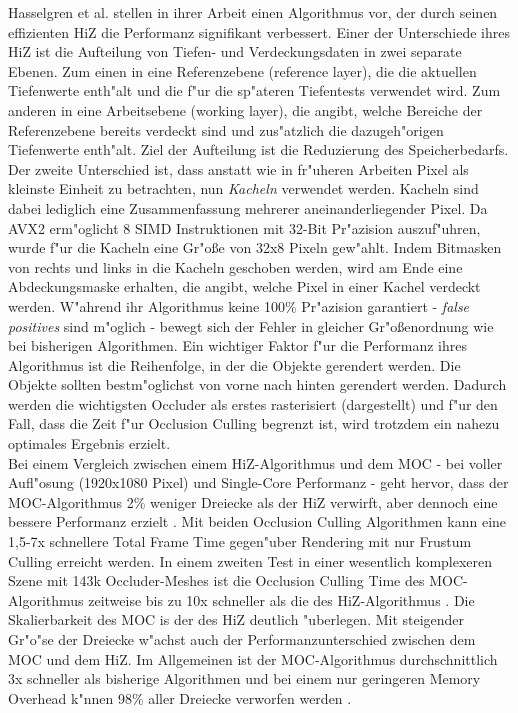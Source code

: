 \documentclass[journal]{vgtc}
\begin{document}
Hasselgren et al. \cite{MSOC} stellen in ihrer Arbeit einen Algorithmus vor, der durch seinen effizienten HiZ die Performanz signifikant verbessert.
Einer der Unterschiede ihres HiZ ist die Aufteilung von Tiefen- und Verdeckungsdaten in zwei separate Ebenen.
Zum einen in eine Referenzebene (reference layer), die die aktuellen Tiefenwerte enth"alt und die f"ur die sp"ateren Tiefentests verwendet wird.
Zum anderen in eine Arbeitsebene (working layer), die angibt, welche Bereiche der Referenzebene bereits verdeckt sind und zus"atzlich die dazugeh"origen Tiefenwerte enth"alt.
Ziel der Aufteilung ist die Reduzierung des Speicherbedarfs.
Der zweite Unterschied ist, dass anstatt wie in fr"uheren Arbeiten Pixel als kleinste Einheit zu betrachten, nun \textit{Kacheln} verwendet werden.
Kacheln sind dabei lediglich eine Zusammenfassung mehrerer aneinanderliegender Pixel.
Da AVX2 erm"oglicht 8 SIMD Instruktionen mit 32-Bit Pr"azision auszuf"uhren, wurde f"ur die Kacheln eine Gr"o\ss{}e von 32x8 Pixeln gew"ahlt.
Indem Bitmasken von rechts und links in die Kacheln geschoben werden, wird am Ende eine Abdeckungsmaske erhalten, die angibt, welche Pixel in einer Kachel verdeckt werden.
W"ahrend ihr Algorithmus keine 100\% Pr"azision garantiert - \textit{false positives} sind m"oglich - bewegt sich der Fehler in gleicher Gr"o\ss{}enordnung wie bei bisherigen Algorithmen.
Ein wichtiger Faktor f"ur die Performanz ihres Algorithmus ist die Reihenfolge, in der die Objekte gerendert werden.
Die Objekte sollten bestm"oglichst von vorne nach hinten gerendert werden.
Dadurch werden die wichtigsten Occluder als erstes rasterisiert (dargestellt) und f"ur den Fall, dass die Zeit f"ur Occlusion Culling begrenzt ist, wird trotzdem ein nahezu optimales Ergebnis erzielt.\\

Bei einem Vergleich zwischen einem HiZ-Algorithmus und dem MOC - bei voller Aufl"osung (1920x1080 Pixel) und Single-Core Performanz - geht hervor, dass der MOC-Algorithmus 2\% weniger Dreiecke als der HiZ verwirft, aber dennoch eine bessere Performanz erzielt \cite{MSOC}.
Mit beiden Occlusion Culling Algorithmen kann eine 1,5-7x schnellere Total Frame Time gegen"uber Rendering mit nur Frustum Culling erreicht werden.
In einem zweiten Test in einer wesentlich komplexeren Szene mit 143k Occluder-Meshes ist die Occlusion Culling Time des MOC-Algorithmus zeitweise bis zu 10x schneller als die des HiZ-Algorithmus \cite{MSOC}.
Die Skalierbarkeit des MOC is der des HiZ deutlich "uberlegen. Mit steigender Gr"o"se der Dreiecke w"achst auch der Performanzunterschied zwischen dem MOC und dem HiZ.
Im Allgemeinen ist der MOC-Algorithmus durchschnittlich 3x schneller als bisherige Algorithmen und bei einem nur geringeren Memory Overhead k"nnen 98\% aller Dreiecke verworfen werden \cite{MSOC}.\\
\end{document}
